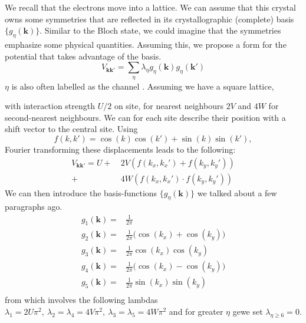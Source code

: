 \documentclass[../main.tex]{subfile}
\begin{document}
We recall that the electrons move into a lattice. We can assume that this crystal owns some symmetries that are reflected in its crystallographic (complete) basis $\{g_{\eta}(\bm{k})\}$.
Similar to the Bloch state, we could imagine that the symmetries emphasize some physical quantities. Assuming this, we propose a form for the potential that takes advantage
of the basis.
\[
    V_{\bm{k}\bm{k}'} = \sum_{\eta} \lambda_{\eta} g_{\eta}(\bm{k})g_{\eta}(\bm{k}')
\]
$\eta$ is also often labelled as the channel \cite{FossheimSudbo2004}. Assuming we have a square lattice, 
\begin{figure}[H]
    \centering
\end{figure}
with interaction strength $U/2$ on site, for nearest neighbours $2V$ and $4W$ for second-nearest neighbours. We can for each site describe their position with a shift vector 
to the central site. Using
\[
    f(k,k')=\cos(k)\cos(k')+\sin(k)\sin(k'),
\]
Fourier transforming these displacements leads to the following:
\[
\begin{aligned}
    V_{\bm{k}\bm{k}'} = U + &~2V\left(f(k_x,k_x')+ f(k_y,k_y')\right)\\
    + &~4W \left(f(k_x,k_x') \cdot f(k_y,k_y')\right)
\end{aligned} 
\]
We can then introduce the basis-functions $\{g_{\eta}(\bm{k})\}$ we talked about a few paragraphs ago.
\begin{align*}
    g_{1}(\bm{k}) =& \frac{1}{2\pi}\\
    g_{2}(\bm{k}) =& \frac{1}{2\pi}\bigl( \cos(k_x) + \cos(k_y)\bigr) \tag{$s$-wave}\\
    g_{3}(\bm{k}) =& \frac{1}{2\pi}\cos(k_x) \cos(k_y)\\
    g_{4}(\bm{k}) =& \frac{1}{2\pi}\bigl( \cos(k_x) - \cos(k_y)\bigr) \tag{$d$-wave}\\
    g_{5}(\bm{k}) =& \frac{1}{2\pi}\sin(k_x) \sin(k_y)\\
\end{align*}
from which involves the following lambdas $\lambda_1 = 2U\pi^2, ~ \lambda_2=\lambda_4 = 4V\pi^2, ~ \lambda_3=\lambda_5=4W \pi^2$ and for greater
$\eta$ gewe set $\lambda_{\eta\ge6} =0$.\\
\end{document}
